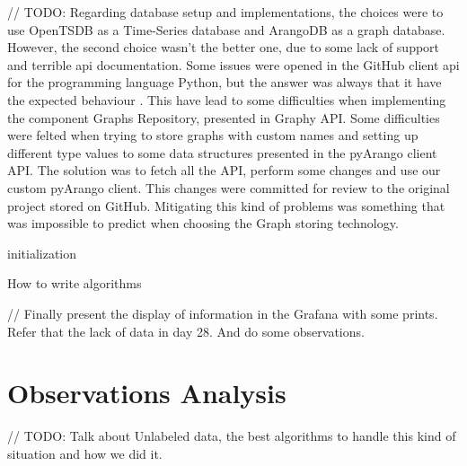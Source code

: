 // TODO: Regarding database setup and implementations, the choices were to use OpenTSDB as a Time-Series database and ArangoDB as a graph database. However, the second choice wasn't the better one, due to some lack of support and terrible \gls{api} documentation. Some issues were opened in the GitHub client \gls{api} for the programming language Python, but the answer was always that it have the expected behaviour \cite{arango_issues}. This have lead to some difficulties when implementing the component Graphs Repository, presented in Graphy API. Some difficulties were felted when trying to store graphs with custom names and setting up different type values to some data structures presented in the pyArango client API. The solution was to fetch all the API, perform some changes and use our custom pyArango client. This changes were committed for review to the original project stored on GitHub. Mitigating this kind of problems was something that was impossible to predict when choosing the Graph storing technology.

\begin{algorithm}[H]
\SetAlgoLined
{}
 initialization\;
 \caption{How to write algorithms}
\end{algorithm}


// Finally present the display of information in the Grafana with some prints. Refer that the lack of data in day 28. And do some observations. 

\section{Observations Analysis}
\label{sec:observations_analysis}

// TODO: Talk about Unlabeled data, the best algorithms to handle this kind of situation and how we did it.




\checkoddpage
{}
{ %
\newpage
\blankpage}
{ %
}
